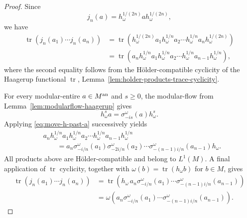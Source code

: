 \documentclass[11pt,a4paper]{article}
\theoremstyle{plain}
\numberwithin{theorem}{section}
\theoremstyle{definition}
\newcommand{\?}{\overset{?}{=}}
\DeclareMathOperator{\tr}{tr}
\begin{document}
\begin{proof}
Since
\[
        j_n(a)=h_\omega^{1/(2n)}ah_\omega^{1/(2n)},
\]
we have
\[
\begin{aligned}
\tr\!\left(j_n(a_1)\cdots j_n(a_n)\right)
&=
\tr\!\left(
h_\omega^{1/(2n)}
a_1h_\omega^{1/n}a_2
\cdots
h_\omega^{1/n}a_n
h_\omega^{1/(2n)}
\right)                                                   \\
&=
\tr\!\left(
a_nh_\omega^{1/n}a_1h_\omega^{1/n}a_2
\cdots
h_\omega^{1/n}a_{n-1}h_\omega^{1/n}
\right),
\end{aligned}
\]
where the second equality follows from the H\"older-compatible cyclicity of
the Haagerup functional $\tr$, Lemma~\ref{lem:holder-products-trace-cyclicity}.

For every modular-entire \(a\in M^{\rm an}\) and \(s\geq0\), the modular-flow
from Lemma~\ref{lem:modularflow-haagerup} gives
\begin{equation}
\label{eq:move-h-past-a}
        h_\omega^s a
        =
        \sigma_{-is}^\omega(a)h_\omega^s .
\end{equation}
Applying \eqref{eq:move-h-past-a} successively yields
\[
\begin{aligned}
&a_nh_\omega^{1/n}a_1h_\omega^{1/n}a_2\cdots
h_\omega^{1/n}a_{n-1}h_\omega^{1/n}                                  \\
&\qquad =
a_n
\sigma_{-i/n}^\omega(a_1)
\sigma_{-2i/n}^\omega(a_2)
\cdots
\sigma_{-(n-1)i/n}^\omega(a_{n-1})
h_\omega .
\end{aligned}
\]
All products above are H\"older-compatible and belong to \(L^1(M)\).
A final application of $\tr$ cyclicity, together with
\(\omega(b)=\tr(h_\omega b)\) for \(b\in M\), gives
\[
\begin{aligned}
\tr\!\left(j_n(a_1)\cdots j_n(a_n)\right)
&=
\tr\!\left(
h_\omega\,a_n
\sigma_{-i/n}^\omega(a_1)
\cdots
\sigma_{-(n-1)i/n}^\omega(a_{n-1})
\right)                                                   \\
&=
\omega\!\left(
a_n
\sigma_{-i/n}^\omega(a_1)
\cdots
\sigma_{-(n-1)i/n}^\omega(a_{n-1})
\right).
\end{aligned}   
\]
\end{proof}
\end{document}
